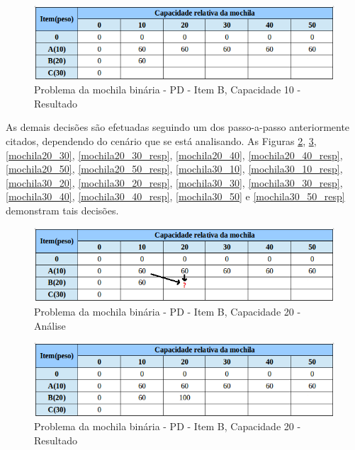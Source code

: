\begin{itemize}
\FloatBarrier
\begin{figure}[!h]
\centering
\includegraphics[keepaspectratio=true,scale=0.5]{figuras/mochila20_10_resp.png}
\caption{Problema da mochila binária - PD - Item B, Capacidade 10 - Resultado}
\label{mochila20_10_resp}
\end{figure}

As demais decisões são efetuadas seguindo um dos passo-a-passo anteriormente citados, dependendo do cenário que se está analisando. As Figuras \ref{mochila20_20}, \ref{mochila20_20_resp}, \ref{mochila20_30}, \ref{mochila20_30_resp}, \ref{mochila20_40}, \ref{mochila20_40_resp}, \ref{mochila20_50}, \ref{mochila20_50_resp}, \ref{mochila30_10}, \ref{mochila30_10_resp}, \ref{mochila30_20}, \ref{mochila30_20_resp}, \ref{mochila30_30}, \ref{mochila30_30_resp}, \ref{mochila30_40}, \ref{mochila30_40_resp}, \ref{mochila30_50} e \ref{mochila30_50_resp} demonstram tais decisões.
\FloatBarrier
\begin{figure}[!h]
\centering
\includegraphics[keepaspectratio=true,scale=0.6]{figuras/mochila20_20.png}
\caption{Problema da mochila binária - PD - Item B, Capacidade 20 - Análise}
\label{mochila20_20}
\end{figure}

\FloatBarrier
\begin{figure}[!h]
\centering
\includegraphics[keepaspectratio=true,scale=0.6]{figuras/mochila20_20_resp.png}
\caption{Problema da mochila binária - PD - Item B, Capacidade 20 - Resultado}
\label{mochila20_20_resp}
\end{figure}


\end{itemize}
